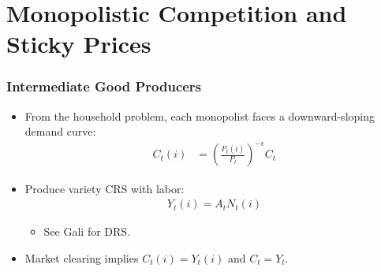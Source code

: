 \documentclass[english,xcolor=svgnames]{beamer}
\begin{document}
\section{Monopolistic Competition and Sticky Prices}

\begin{frame}
\frametitle{Intermediate Good Producers}
\begin{itemize}
	\item From the household problem, each monopolist faces a downward-sloping demand curve:
	\begin{align*}
		C_t(i)&=\left(\frac{P_t(i)}{ P_t}\right)^{-\epsilon} C_t
	\end{align*} 
	\item Produce variety CRS with labor:
	\begin{align*}
		Y_t(i)=A_t N_t(i)
	\end{align*}
	\begin{itemize}
		\item See Gali for DRS.
	\end{itemize}
	\item Market clearing implies $C_t(i)=Y_t(i)$ and $C_t=Y_t$.
\end{itemize}
\end{frame}
\end{document}
